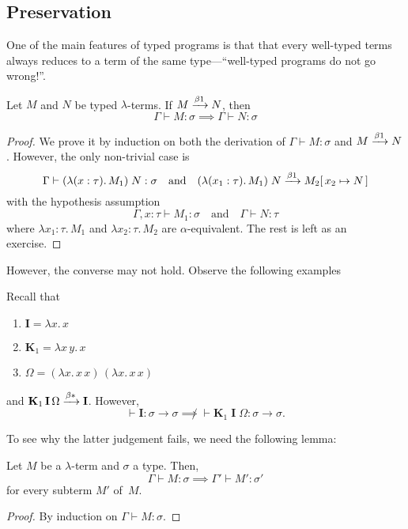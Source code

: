\subsection{Preservation}
One of the main features of typed programs is that that every well-typed terms
always reduces to a term of the same type---``well-typed programs do not go
wrong!''.
\begin{theorem}
  \label{thm:preservation}
  Let $M$ and $N$ be typed $\lambda$-terms. 
  If $M \xrightarrow{\beta1} N$, then
  \[
    \Gamma \vdash M : \sigma \implies \Gamma \vdash N : \sigma
  \]
\end{theorem}
\begin{proof}
  We prove it by induction on both the derivation of $\Gamma \vdash M :
  \sigma$ and $M \xrightarrow{\beta1} N$. However, the only non-trivial case is
  \[
    \Gamma \vdash (\lambda (x : \tau).\, M_1)\; N : \sigma
    \quad\text{and}\quad
    (\lambda (x_1 : \tau).\, M_1)\;N \xrightarrow{\beta1} M_2[\,x_2\mapsto N\,]
  \]
  with the hypothesis assumption
  \[
    \Gamma, x : \tau \vdash M_1 : \sigma
    \quad\text{and}\quad
    \Gamma \vdash N : \tau
  \]
  where $\lambda x_1:\tau.\,M_1$ and $\lambda x_2:\tau.\,M_2$ are
  $\alpha$-equivalent. The rest is left as an exercise.
\end{proof}
However, the converse may not hold. Observe the following examples
\begin{example}
  Recall that 
  \begin{enumerate}
    \item $\mathbf{I} = \lambda x.\, x$
    \item $\mathbf{K}_1 = \lambda x\,y.\, x$
    \item $\Omega = (\lambda x.\, x\,x)\,(\lambda x.\, x\,x)$
  \end{enumerate}
  and $\mathbf{K}_1\,\mathbf{I}\,\Omega \xrightarrow{\beta*} \mathbf{I}$. However, 
  \[
    \vdash \mathbf{I} : \sigma \to \sigma
    \not\implies
    \vdash \mathbf{K}_1\;\mathbf{I}\;\Omega : \sigma \to \sigma.
  \]
\end{example}
To see why the latter judgement fails, we need the following lemma:
\begin{lemma}
  Let $M$ be a  $\lambda$-term and $\sigma$ a type. Then,  
  \[
    \Gamma \vdash M : \sigma 
    \implies \Gamma' \vdash M' : \sigma'
  \]
  for every subterm $M'$ of~$M$.
\end{lemma}
\begin{proof}
  By induction on $\Gamma \vdash M : \sigma$.
\end{proof}
%
%
